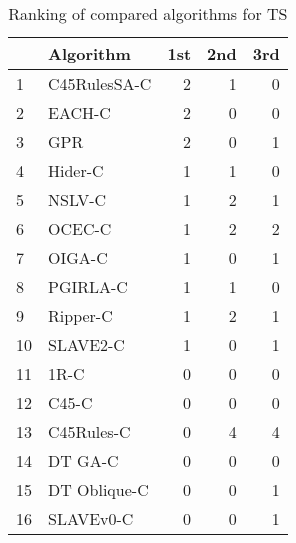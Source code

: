 \begin{table}
\footnotesize
\caption{Ranking of compared algorithms for TS}
\label{tab:places TS}
\begin{tabular}{llrrr}
\hline
 & Algorithm & 1st & 2nd & 3rd \\
\hline
1 & C45RulesSA-C & 2 & 1 & 0 \\
2 & EACH-C & 2 & 0 & 0 \\
3 & GPR & 2 & 0 & 1 \\
4 & Hider-C & 1 & 1 & 0 \\
5 & NSLV-C & 1 & 2 & 1 \\
6 & OCEC-C & 1 & 2 & 2 \\
7 & OIGA-C & 1 & 0 & 1 \\
8 & PGIRLA-C & 1 & 1 & 0 \\
9 & Ripper-C & 1 & 2 & 1 \\
10 & SLAVE2-C & 1 & 0 & 1 \\
11 & 1R-C & 0 & 0 & 0 \\
12 & C45-C & 0 & 0 & 0 \\
13 & C45Rules-C & 0 & 4 & 4 \\
14 & DT GA-C & 0 & 0 & 0 \\
15 & DT Oblique-C & 0 & 0 & 1 \\
16 & SLAVEv0-C & 0 & 0 & 1 \\
\hline
\end{tabular}
\end{table}
